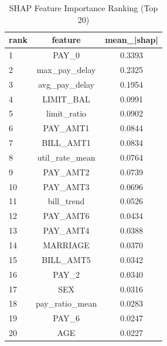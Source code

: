 \begin{table}
\centering
\caption{SHAP Feature Importance Ranking (Top 20)}
\label{tab:shap_ranking}
\begin{tabular}{lcc}
\toprule
rank & feature & mean_|shap| \\
\midrule
1 & PAY_0 & 0.3393 \\
2 & max_pay_delay & 0.2325 \\
3 & avg_pay_delay & 0.1954 \\
4 & LIMIT_BAL & 0.0991 \\
5 & limit_ratio & 0.0902 \\
6 & PAY_AMT1 & 0.0844 \\
7 & BILL_AMT1 & 0.0834 \\
8 & util_rate_mean & 0.0764 \\
9 & PAY_AMT2 & 0.0739 \\
10 & PAY_AMT3 & 0.0696 \\
11 & bill_trend & 0.0526 \\
12 & PAY_AMT6 & 0.0434 \\
13 & PAY_AMT4 & 0.0388 \\
14 & MARRIAGE & 0.0370 \\
15 & BILL_AMT5 & 0.0342 \\
16 & PAY_2 & 0.0340 \\
17 & SEX & 0.0316 \\
18 & pay_ratio_mean & 0.0283 \\
19 & PAY_6 & 0.0247 \\
20 & AGE & 0.0227 \\
\bottomrule
\end{tabular}
\end{table}
